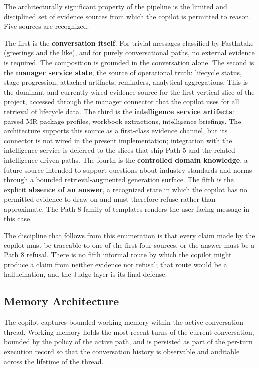 The architecturally significant property of the pipeline is the limited and disciplined set of evidence sources from which the copilot is permitted to reason. Five sources are recognized.

The first is the \textbf{conversation itself}. For trivial messages classified by FastIntake (greetings and the like), and for purely conversational paths, no external evidence is required. The composition is grounded in the conversation alone. The second is the \textbf{manager service state}, the source of operational truth: lifecycle status, stage progression, attached artifacts, reminders, analytical aggregations. This is the dominant and currently-wired evidence source for the first vertical slice of the project, accessed through the manager connector that the copilot uses for all retrieval of lifecycle data. The third is the \textbf{intelligence service artifacts}: parsed MR package profiles, workbook extractions, intelligence briefings. The architecture supports this source as a first-class evidence channel, but its connector is not wired in the present implementation; integration with the intelligence service is deferred to the slices that ship Path 5 and the related intelligence-driven paths. The fourth is the \textbf{controlled domain knowledge}, a future source intended to support questions about industry standards and norms through a bounded retrieval-augmented generation surface. The fifth is the explicit \textbf{absence of an answer}, a recognized state in which the copilot has no permitted evidence to draw on and must therefore refuse rather than approximate. The Path 8 family of templates renders the user-facing message in this case.

The discipline that follows from this enumeration is that every claim made by the copilot must be traceable to one of the first four sources, or the answer must be a Path 8 refusal. There is no fifth informal route by which the copilot might produce a claim from neither evidence nor refusal; that route would be a hallucination, and the Judge layer is its final defense.

\subsection*{Memory Architecture}
The copilot captures bounded working memory within the active conversation thread. Working memory holds the most recent turns of the current conversation, bounded by the policy of the active path, and is persisted as part of the per-turn execution record so that the conversation history is observable and auditable across the lifetime of the thread.

